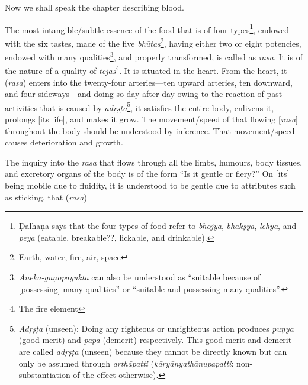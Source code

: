 \begin{translation}    
\item [1] Now we shall speak the chapter describing blood.

\item [2]

    
\item [3]    
    The most intangible/subtle essence of the food that is of four types\footnote{Ḍalhaṇa says that the four types of food refer to \emph{bhojya}, \emph{bhakṣya}, \emph{lehya}, and \emph{peya} (eatable, breakable??, lickable, and drinkable).}, endowed with the six tastes, made of the five \emph{bhūtas}\footnote{Earth, water, fire, air, space}, having either two or eight potencies, endowed with many qualities\footnote{\emph{Aneka-guṇopayukta} can also be understood as “suitable because of [possessing] many qualities” or “suitable and possessing many qualities”.}, and properly transformed, is called as \emph{rasa}. It is of the nature of a quality of \emph{tejas}\footnote{The fire element}. It is situated in the heart. From the heart, it (\emph{rasa}) enters into the twenty-four arteries—ten upward arteries, ten downward, and four sideways—and doing so day after day owing to the reaction of past activities that is caused by \emph{adṛṣṭa}\footnote{\emph{Adṛṣṭa} (unseen): Doing any righteous or unrighteous action produces \emph{puṇya} (good merit) and \emph{pāpa} (demerit) respectively. This good merit and demerit are called \emph{adṛṣṭa} (unseen) because they cannot be directly known but can only be assumed through \emph{arthāpatti} (\emph{kāryānyathānupapatti}: non-substantiation of the effect otherwise).}, it satisfies the entire body, enlivens it, prolongs [its life], and makes it grow. The movement/speed of that flowing [\emph{rasa}] throughout the body should be understood by inference. That movement/speed causes deterioration and growth. 
    
    The inquiry into the \emph{rasa} that flows through all the limbs, humours, body tissues, and excretory organs of the body is of the form “Is it gentle or fiery?” On [its] being mobile due to fluidity, it is understood to be gentle due to attributes such as sticking, that (\emph{rasa})

    
\item [4]  

\item [5]


\item [6]
\item [7]
   
\end{translation}

